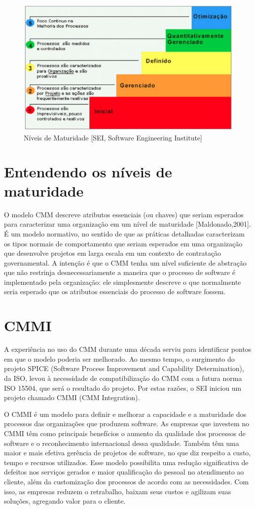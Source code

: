 \begin{figure}[H]
    \centering
    \includegraphics[width=0.7\linewidth]{dados/figuras/cmm}
    \caption{Níveis de Maturidade [SEI, Software Engineering Institute]}
    \label{fig:cmm}
\end{figure}

\nocite{cmmcmmi}

\section{Entendendo os níveis de maturidade}

O modelo CMM descreve atributos essenciais (ou chaves) que seriam esperados
para caracterizar uma organização em um nível de maturidade [Maldonado,2001]. É um
modelo normativo, no sentido de que as práticas detalhadas caracterizam os tipos normais
de comportamento que seriam esperados em uma organização que desenvolve projetos em
larga escala em um contexto de contratação governamental. A intenção é que o CMM tenha
um nível suficiente de abstração que não restrinja desnecessariamente a maneira que o
processo de software é implementado pela organização: ele simplesmente descreve o que
normalmente seria esperado que os atributos essenciais do processo de software fossem.

\section{CMMI}

A experiência no uso do CMM durante uma década serviu para identificar pontos
em que o modelo poderia ser melhorado. Ao mesmo tempo, o surgimento do projeto SPICE
(Software Process Improvement and Capability Determination), da ISO, levou à
necessidade de compatibilização do CMM com a futura norma ISO 15504, que será o
resultado do projeto. Por estas razões, o SEI iniciou um projeto chamado CMMI (CMM
Integration).

O CMMI é um modelo para definir e melhorar a capacidade e a maturidade dos
processos das organizações que produzem software. As empresas que investem no CMMI
têm como principais benefícios o aumento da qualidade dos processos de software e o
reconhecimento internacional dessa qualidade. Também têm uma maior e mais efetiva gerência de projetos de software, no que diz respeito a custo, tempo e recursos utilizados.
Esse modelo possibilita uma redução significativa de defeitos nos serviços gerados e
maior qualificação do pessoal no atendimento ao cliente, além da customização dos
processos de acordo com as necessidades. Com isso, as empresas reduzem o retrabalho,
baixam seus custos e agilizam suas soluções, agregando valor para o cliente.

